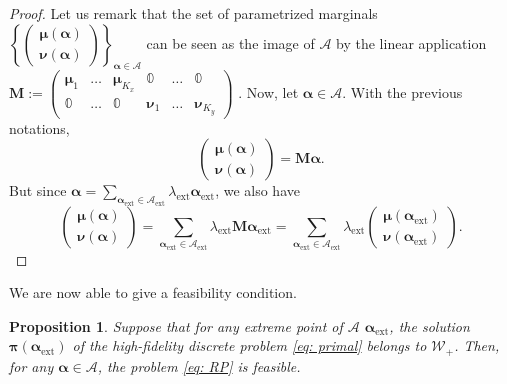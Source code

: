 \documentclass{article}
\def\cA{\mathcal{A}}
\def\cW{\mathcal{W}}
\def\aalpha{\boldsymbol{\alpha}}
\def\ppi{\boldsymbol{\pi}}
\def\mmu{\boldsymbol{\mu}}
\def\nnu{\boldsymbol{\nu}}
\def\00{\mathbb{0}}
\newtheorem{prop}[thm]{Proposition}
\begin{document}
%
\begin{proof}
Let us remark that the set of parametrized marginals $\left\lbrace \begin{pmatrix} \mmu(\aalpha) \\ \nnu(\aalpha) \end{pmatrix} \right\rbrace_{\aalpha \in \cA}$ can be seen as the image of $\cA$ by the linear application 
%
$\textbf{M} := \begin{pmatrix}
    \mmu_1 & \dots & \mmu_{K_x} & \00 & \dots & \00 \\
    \00 & \dots & \00 & \nnu_1 & \dots & \nnu_{K_y}
\end{pmatrix}$ .
%
Now, let $\aalpha \in \cA$. With the previous notations, 
%
\begin{equation}
    \begin{pmatrix}
        \mmu(\aalpha) \\ \nnu(\aalpha) 
    \end{pmatrix} = \textbf{M} \aalpha.
\end{equation}
%
But since $\displaystyle \aalpha = \sum_{\aalpha_{\text{ext}} \in \cA_{\text{ext}}} \lambda_{\text{ext}} \aalpha_{\text{ext}}$, we also have
%
\begin{equation}
    \begin{pmatrix}
        \mmu(\aalpha) \\ \nnu(\aalpha) 
    \end{pmatrix}
    = \sum_{\aalpha_{\text{ext}} \in \cA_{\text{ext}}} \lambda_{\text{ext}} \textbf{M} \aalpha_{\text{ext}} 
     = \sum_{\aalpha_{\text{ext}} \in \cA_{\text{ext}}} \lambda_{\text{ext}} \begin{pmatrix}
          \mmu(\aalpha_{\text{ext}}) \\ \nnu(\aalpha_{\text{ext}}) 
      \end{pmatrix} .
\end{equation}
%
\end{proof}
%
We are now able to give a feasibility condition.
%
\begin{prop}\label{prop: feasible set not empty}
    Suppose that for any extreme point of $\cA$ $\aalpha_{\text{ext}}$, the solution $\ppi(\aalpha_{\text{ext}})$ of the high-fidelity discrete problem \ref{eq: primal} belongs to $\cW_+$. Then, for any $\aalpha \in \cA$, the problem \ref{eq: RP} is feasible.
\end{prop}
%
\end{document}
